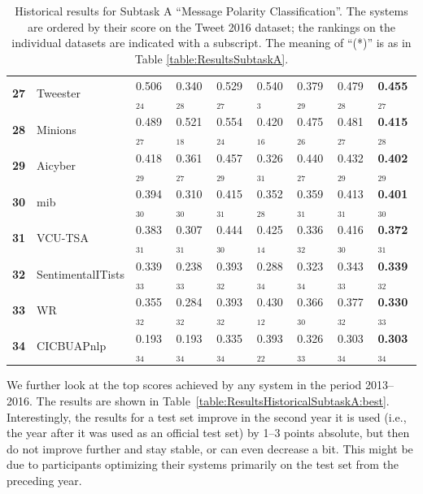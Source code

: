 \documentclass[11pt,letterpaper]{article}
\begin{document}
\begin{table}[thb!]
\begin{small}
{\begin{tabular}{|c|l|ll|lll|l|l|}
      \bf 27 & Tweester & 0.506$_{24}$ & 0.340$_{28}$ & 0.529$_{27}$ & 0.540$_{3}$ & 0.379$_{29}$ & 0.479$_{28}$ & \bf 0.455$_{27}$ \\
      \bf 28 & Minions & 0.489$_{27}$ & 0.521$_{18}$ & 0.554$_{24}$ & 0.420$_{16}$ & 0.475$_{26}$ & 0.481$_{27}$ & \bf 0.415$_{28}$ \\
      \bf 29 & Aicyber & 0.418$_{29}$ & 0.361$_{27}$ & 0.457$_{29}$ & 0.326$_{31}$ & 0.440$_{27}$ & 0.432$_{29}$ & \bf 0.402$_{29}$ \\
      \bf 30 & mib & 0.394$_{30}$ & 0.310$_{30}$ & 0.415$_{31}$ & 0.352$_{28}$ & 0.359$_{31}$ & 0.413$_{31}$ & \bf 0.401$_{30}$ \\
      \bf 31 & VCU-TSA & 0.383$_{31}$ & 0.307$_{31}$ & 0.444$_{30}$ & 0.425$_{14}$ & 0.336$_{32}$ & 0.416$_{30}$ & \bf 0.372$_{31}$ \\
      \bf 32 & SentimentalITists & 0.339$_{33}$ & 0.238$_{33}$ & 0.393$_{32}$ & 0.288$_{34}$ & 0.323$_{34}$ & 0.343$_{33}$ & \bf 0.339$_{32}$ \\
      \bf 33 & WR & 0.355$_{32}$ & 0.284$_{32}$ & 0.393$_{32}$ & 0.430$_{12}$ & 0.366$_{30}$ & 0.377$_{32}$ & \bf 0.330$_{33}$ \\
      \bf 34 & CICBUAPnlp & 0.193$_{34}$ & 0.193$_{34}$ & 0.335$_{34}$ & 0.393$_{22}$ & 0.326$_{33}$ & 0.303$_{34}$ & \bf 0.303$_{34}$ \\
      \hline
    \end{tabular}\medskip
    }
    \caption{\label{table:ResultsHistoricalSubtaskA} Historical
    results for Subtask A ``Message Polarity Classification''. The
    systems are ordered by their score on the Tweet 2016 dataset; the
    rankings on the individual datasets are indicated with a
    subscript. The meaning of ``(*)'' is as in Table
    \ref{table:ResultsSubtaskA}.}
  \end{small}
\end{table}
\renewcommand{\baselinestretch}{1.00}

We further look at the top scores achieved by any system in the period
2013--2016.  The results are shown in
Table~\ref{table:ResultsHistoricalSubtaskA:best}.  Interestingly, the
results for a test set improve in the second year it is used (i.e.,
the year after it was used as an official test set) by 1--3 points
absolute, but then do not improve further and stay stable,
or can even decrease a bit. This might be due to participants
optimizing their systems primarily on the test set from the preceding
year.
\end{document}
